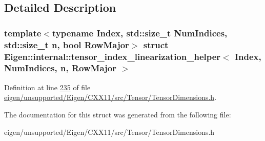 \subsection{Detailed Description}
\subsubsection*{template$<$typename Index, std\+::size\+\_\+t Num\+Indices, std\+::size\+\_\+t n, bool Row\+Major$>$\newline
struct Eigen\+::internal\+::tensor\+\_\+index\+\_\+linearization\+\_\+helper$<$ Index, Num\+Indices, n, Row\+Major $>$}



Definition at line \hyperlink{eigen_2unsupported_2_eigen_2_c_x_x11_2src_2_tensor_2_tensor_dimensions_8h_source_l00235}{235} of file \hyperlink{eigen_2unsupported_2_eigen_2_c_x_x11_2src_2_tensor_2_tensor_dimensions_8h_source}{eigen/unsupported/\+Eigen/\+C\+X\+X11/src/\+Tensor/\+Tensor\+Dimensions.\+h}.



The documentation for this struct was generated from the following file\+:\begin{DoxyCompactItemize}
\item 
eigen/unsupported/\+Eigen/\+C\+X\+X11/src/\+Tensor/\+Tensor\+Dimensions.\+h\end{DoxyCompactItemize}
